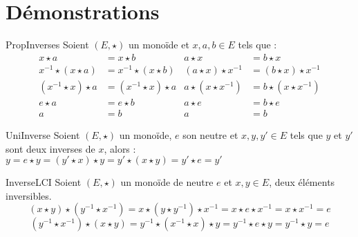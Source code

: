 \documentclass[12pt,a4paper]{report}
\begin{document}
    \pagebreak

\section*{Démonstrations}

    \begin{demonstration}{PropInverses}
    Soient $(E, \star)$ un monoïde et $x, a, b \in E$ tels que :
    \begin{align*}
        x \star a &= x \star b
        & a \star x &= b \star x \\
        x^{-1} \star (x \star a) &= x^{-1} \star (x \star b)
        & (a \star x) \star x^{-1} &= (b \star x) \star x^{-1} \\
        \left(x^{-1} \star x\right) \star a &= \left(x^{-1} \star x\right) \star a
        & a \star \left(x \star x^{-1}\right) &= b \star \left(x \star x^{-1}\right) \\
        e \star a &= e \star b
        & a \star e &= b \star e \\
        a &= b
        & a &= b
    \end{align*}
    \end{demonstration}

    \begin{demonstration}{UniInverse}
    Soient $(E, \star)$ un monoïde, $e$ son neutre et $x, y, y' \in E$ tels que $y$ et $y'$ sont deux inverses de $x$, alors : $ y = e \star y = (y' \star x) \star y = y' \star (x \star y) = y' \star e = y' $
    \end{demonstration}
    
    \begin{demonstration}{InverseLCI}
    Soient $(E, \star)$ un monoïde de neutre $e$ et $x, y \in E$, deux éléments inversibles.
    $$  (x \star y) \star \left(y^{-1} \star x^{-1}\right) = x \star \left(y \star y^{-1}\right) \star x^{-1} = x \star e \star x^{-1} = x \star x^{-1} = e $$
    $$ \left(y^{-1} \star x^{-1}\right) \star (x \star y) = y^{-1} \star \left(x^{-1} \star x\right) \star y = y^{-1} \star e \star y = y^{-1} \star y = e $$
    \end{demonstration}
    
\end{document}
